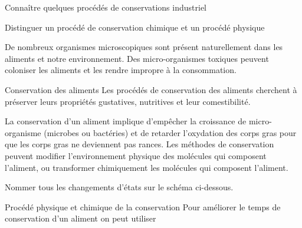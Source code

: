 \teteTermStssAlim
\vspace*{-30pt}

\begin{objectifs}
  \item Connaître quelques procédés de conservations industriel
  \item Distinguer un procédé de conservation chimique et un procédé physique
\end{objectifs}

\begin{contexte}
  De nombreux organismes microscopiques sont présent naturellement dans les aliments et notre environnement.
  Des micro-organismes toxiques peuvent coloniser les aliments et les rendre impropre à la consommation.

\end{contexte}


\begin{doc}{Conservation des aliments}
  Les procédés de conservation des aliments cherchent à préserver leurs propriétés gustatives, nutritives et leur comestibilité.

  La conservation d'un aliment implique d'empêcher la croissance de micro-organisme (microbes ou bactéries) et de retarder l'oxydation des corps gras pour que les corps gras ne deviennent pas rances.
  Les méthodes de conservation peuvent modifier l'environnement physique des molécules qui composent l'aliment, ou transformer chimiquement les molécules qui composent l'aliment.
\end{doc}

\schematisation Nommer tous les changements d'états sur le schéma ci-dessous.

\begin{center}
\end{center}


\begin{doc}{Procédé physique et chimique de la conservation}
  Pour améliorer le temps de conservation d'un aliment on peut utiliser
  \begin{importants}
  \end{importants}
\end{doc}


